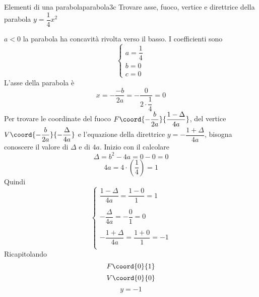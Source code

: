 \begin{center}
	
	\label{fig:disegnoparabola3b}
\end{center}
\begin{esempiot}{Elementi di una parabola}{parabola3c}
	Trovare asse, fuoco, vertice e direttrice della parabola $y=\dfrac{1}{4}x^2$
\end{esempiot}
$a<0$ la parabola ha concavità rivolta verso il basso. I coefficienti sono\[\begin{cases}
a=\dfrac{1}{4}\\
b=0\\
c=0
\end{cases} \]
L'asse della parabola è\[x=-\dfrac{-b}{2a}=-\dfrac{0}{2\cdot\dfrac{1}{4}}=0 \]
Per trovare le coordinate del fuoco $F\coord{-\dfrac{b}{2a}}{\dfrac{1-\Delta}{4a}}$, del vertice $V\coord{-\dfrac{b}{2a}}{-\dfrac{\Delta}{4a}}$ e l'equazione della direttrice $y=-\dfrac{1+\Delta}{4a}$, bisogna conoscere il valore di $\Delta$ e di $4a$. Inizio con il calcolare \[\Delta=b^2-4a=0-0=0\]
\[4a=4\cdot\left(\dfrac{1}{4}\right)=1\]
Quindi \[\begin{cases}
\dfrac{1-\Delta}{4a}=\dfrac{1-0}{1}=1\\
\\
-\dfrac{\Delta}{4a}=-\dfrac{0}{1}=0\\
\\
-\dfrac{1+\Delta}{4a}=\dfrac{1+0}{1}=-1\\
\end{cases} \]
Ricapitolando \[F\coord{0}{1} \]\[V\coord{0}{0} \]\[y=-1 \]
\begin{center}
	
	\label{fig:disegnoparabola3c}
\end{center}

